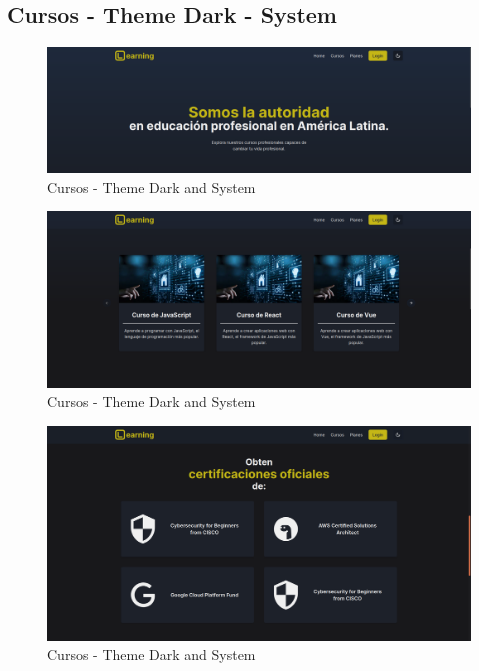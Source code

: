 \subsection{Cursos - Theme Dark - System}
  \begin{figure}[H]
    \centering
    \includegraphics[width=1.0\textwidth]{img/C-DS1.png}
    \caption{Cursos - Theme Dark and System}
  \end{figure}
  \begin{figure}[H]
    \centering
    \includegraphics[width=1.0\textwidth]{img/C-DS2.png}
    \caption{Cursos - Theme Dark and System}
  \end{figure}
  \begin{figure}[H]
    \centering
    \includegraphics[width=1.0\textwidth]{img/C-DS3.png}
    \caption{Cursos - Theme Dark and System}
  \end{figure}

